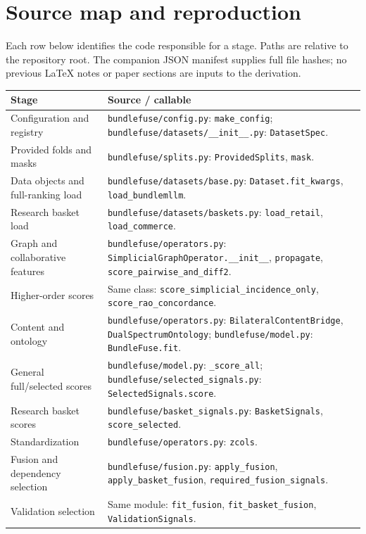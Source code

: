 \documentclass[11pt,a4paper]{article}
\newcommand{\code}[1]{\nolinkurl{#1}}
\numberwithin{equation}{section}
\begin{document}
\section{Source map and reproduction}\label{app:map}
Each row below identifies the code responsible for a stage. Paths are relative to the
repository root. The companion JSON manifest supplies full file hashes; no previous
LaTeX notes or paper sections are inputs to the derivation.
\small
\begin{longtable}{@{}>{\raggedright\arraybackslash}p{.26\linewidth}>{\raggedright\arraybackslash}p{.68\linewidth}@{}}
\toprule Stage & Source / callable \\\midrule\endhead
Configuration and registry & \code{bundlefuse/config.py}: \code{make_config}; \code{bundlefuse/datasets/__init__.py}: \code{DatasetSpec}. \\
Provided folds and masks & \code{bundlefuse/splits.py}: \code{ProvidedSplits}, \code{mask}. \\
Data objects and full-ranking load & \code{bundlefuse/datasets/base.py}: \code{Dataset.fit_kwargs}, \code{load_bundlemllm}. \\
Research basket load & \code{bundlefuse/datasets/baskets.py}: \code{load_retail}, \code{load_commerce}. \\
Graph and collaborative features & \code{bundlefuse/operators.py}: \code{SimplicialGraphOperator.__init__}, \code{propagate}, \code{score_pairwise_and_diff2}. \\
Higher-order scores & Same class: \code{score_simplicial_incidence_only}, \code{score_rao_concordance}. \\
Content and ontology & \code{bundlefuse/operators.py}: \code{BilateralContentBridge}, \code{DualSpectrumOntology}; \code{bundlefuse/model.py}: \code{BundleFuse.fit}. \\
General full/selected scores & \code{bundlefuse/model.py}: \code{_score_all}; \code{bundlefuse/selected_signals.py}: \code{SelectedSignals.score}. \\
Research basket scores & \code{bundlefuse/basket_signals.py}: \code{BasketSignals}, \code{score_selected}. \\
Standardization & \code{bundlefuse/operators.py}: \code{zcols}. \\
Fusion and dependency selection & \code{bundlefuse/fusion.py}: \code{apply_fusion}, \code{apply_basket_fusion}, \code{required_fusion_signals}. \\
Validation selection & Same module: \code{fit_fusion}, \code{fit_basket_fusion}, \code{ValidationSignals}. \\

\end{longtable}
\end{document}
